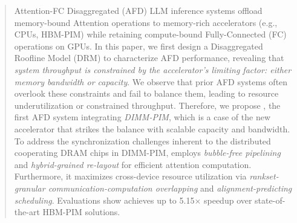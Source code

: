 \begin{abstract}
Attention-FC Disaggregated (AFD) LLM inference systems offload memory-bound Attention operations to memory-rich accelerators (e.g., CPUs, HBM-PIM) while retaining compute-bound Fully-Connected (FC) operations on GPUs. 
In this paper, we first design a Disaggregated Roofline Model (DRM) to characterize AFD performance, revealing that \emph{system throughput is constrained by the accelerator's limiting factor: either memory bandwidth or capacity}.
We observe that prior AFD systems often overlook these constraints and fail to balance them, leading to resource underutilization or constrained throughput.
Therefore, we propose \sys, the first AFD system integrating \textit{DIMM-PIM}, which is a case of the new accelerator that strikes the balance with scalable capacity and bandwidth.
To address the synchronization challenges inherent to the distributed cooperating DRAM chips in DIMM-PIM, \sys employs \emph{bubble-free pipelining} and \emph{hybrid-grained re-layout} for efficient attention computation.
Furthermore, it maximizes cross-device resource utilization via \emph{rankset-granular communication-computation overlapping} and \emph{alignment-predicting scheduling}. 
Evaluations show \sys achieves up to 5.15$\times$ speedup over state-of-the-art HBM-PIM solutions.











\end{abstract}


